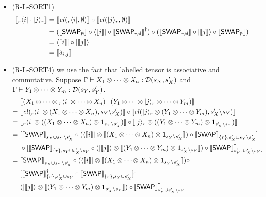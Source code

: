 \begin{itemize}
  \item (R-L-SORT1) 
  \begin{align*}
    {\llbracket {}_r\langle i|\cdot|j\rangle_r \rrbracket} &= {\llbracket {\mathit{cl}}({}_r\langle i|,\emptyset) \rrbracket} \circ {\llbracket {\mathit{cl}}(|j\rangle_r,\emptyset) \rrbracket} \\
    &= ({\llbracket {\mathsf{SWAP}}_{\emptyset} \rrbracket} \circ \langle{\llbracket i \rrbracket}| \circ {\llbracket {\mathsf{SWAP}}_{r,\emptyset} \rrbracket}^\dagger) \circ ({\llbracket {\mathsf{SWAP}}_{r,\emptyset} \rrbracket} \circ |{\llbracket j \rrbracket}\rangle\circ {\llbracket {\mathsf{SWAP}}_{\emptyset} \rrbracket}) \\
    &= \langle{\llbracket i \rrbracket}|\circ |{\llbracket j \rrbracket}\rangle \\
    &= {\llbracket \delta_{i,j} \rrbracket}
  \end{align*}

  \item (R-L-SORT4) we use the fact that labelled tensor is associative and commutative. Suppose $\Gamma \vdash X_1\otimes \cdots \otimes X_n : {\mathcal{D}}(s_X, s_X')$ and $\Gamma \vdash Y_1\otimes \cdots \otimes Y_m : {\mathcal{D}}(s_Y, s_Y')$.
  \begin{align*}
    &\sem{(X_1\otimes\cdots\otimes {}_r\<i|\otimes\cdots\otimes X_n)\cdot (Y_1\otimes\cdots\otimes |j\>_r \otimes\cdots\otimes Y_m)} \\
    =\ & \sem{\cl({}_r\<i| \otimes (X_1\otimes\cdots\otimes X_n), s_Y\backslash s_X')}\circ 
    \sem{\cl(|j\>_r \otimes (Y_1\otimes\cdots\otimes Y_m), s_X'\backslash s_Y)} \\
    =\ & \sem{{}_r\<i| \otimes ((X_1\otimes\cdots\otimes X_n) \otimes \mathbf{1}_{s_Y\backslash s_X'})}\circ 
    \sem{|j\>_r \otimes ((Y_1\otimes\cdots\otimes Y_m) \otimes \mathbf{1}_{s_X'\backslash s_Y})} \\
    =\ & [\sem{\Swap}_{s_X \cup s_Y\backslash s_X'}\circ(\<\sem{i}| \otimes \sem{(X_1\otimes\cdots\otimes X_n) \otimes \mathbf{1}_{s_Y\backslash s_X'}})\circ \sem{\Swap}_{\{r\}, s_X' \cup s_Y\backslash s_X'}^\dagger] \\
    & \circ [\sem{\Swap}_{\{r\}, s_Y \cup s_X'\backslash s_Y}\circ(|\sem{j}\> \otimes \sem{(Y_1\otimes\cdots\otimes Y_m) \otimes \mathbf{1}_{s_X'\backslash s_Y}})\circ \sem{\Swap}_{s_Y' \cup s_X'\backslash s_Y}^\dagger]\\
    =\ & \sem{\Swap}_{s_X\cup s_Y\backslash s_X'}\circ(\<\sem{i}| \otimes \sem{(X_1\otimes\cdots\otimes X_n) \otimes \mathbf{1}_{s_Y\backslash s_X'}})\circ \\
    &[\sem{\Swap}_{\{r\}, s_X'\cup s_Y}^\dagger
     \circ \sem{\Swap}_{\{r\}, s_Y \cup s_X'}] \circ \\
    &(|\sem{j}\> \otimes \sem{(Y_1\otimes\cdots\otimes Y_m) \otimes \mathbf{1}_{s_X'\backslash s_Y}})\circ \sem{\Swap}_{s_Y'\cup s_X'\backslash s_Y}^\dagger\\

\end{align*}
\end{itemize}
